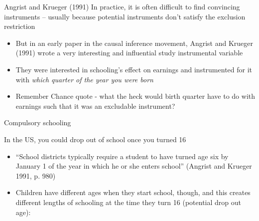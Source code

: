 \documentclass{beamer}
\begin{document}
\begin{frame}{Angrist and Krueger (1991)}
  In practice, it is often difficult to find convincing instruments -- usually because potential instruments don't satisfy the exclusion restriction

  \begin{itemize}
    \item But in an early paper in the causal inference movement, Angrist and Krueger (1991) wrote a very interesting and influential study instrumental variable

    \item They were interested in schooling's effect on earnings and instrumented for it with \emph{which quarter of the year you were born}

    \item Remember Chance quote - what the heck would birth quarter have to do with earnings such that it was an excludable instrument?
  \end{itemize}

\end{frame}


\begin{frame}{Compulsory schooling}

  In the US, you could drop out of school once you turned 16

  \begin{itemize}
    \item ``School districts typically require a student to have turned age six by January 1 of the year in which he or she enters school'' (Angrist and Krueger 1991, p. 980)

    \item Children have different ages when they start school, though, and this creates different lengths of schooling at the time they turn 16 (potential drop out age):
  \end{itemize}

\end{frame}
\end{document}
